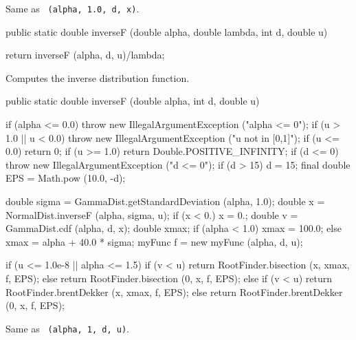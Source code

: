   \begin{tabb}
  Same as ~\texttt{(alpha, 1.0, d, x)}.
 \end{tabb}
\begin{code}

   public static double inverseF (double alpha, double lambda, int d,
                                  double u)\begin{hide} {
      return inverseF (alpha, d, u)/lambda;
   }\end{hide}
\end{code}
\begin{tabb}  Computes the inverse distribution function.
\end{tabb}
\begin{code}

   public static double inverseF (double alpha, int d, double u)\begin{hide} {
      if (alpha <= 0.0)
         throw new IllegalArgumentException ("alpha <= 0");
      if (u > 1.0 || u < 0.0)
         throw new IllegalArgumentException ("u not in [0,1]");
      if (u <= 0.0)
         return 0;
      if (u >= 1.0)
         return Double.POSITIVE_INFINITY;
      if (d <= 0)
         throw new IllegalArgumentException ("d <= 0");
      if (d > 15)
         d = 15;
      final double EPS = Math.pow (10.0, -d);

      double sigma = GammaDist.getStandardDeviation (alpha, 1.0);
      double x = NormalDist.inverseF (alpha, sigma, u);
      if (x < 0.)
         x = 0.;
      double v = GammaDist.cdf (alpha, d, x);
      double xmax;
      if (alpha < 1.0)
         xmax = 100.0;
      else
         xmax = alpha + 40.0 * sigma;
      myFunc f = new myFunc (alpha, d, u);

     if (u <= 1.0e-8 || alpha <= 1.5) {
         if (v < u)
            return RootFinder.bisection (x, xmax, f, EPS);
         else
            return RootFinder.bisection (0, x, f, EPS);
      } else {
          if (v < u)
            return RootFinder.brentDekker (x, xmax, f, EPS);
         else
            return RootFinder.brentDekker (0, x, f, EPS);
      }
   }\end{hide}
\end{code}
\begin{tabb} Same as
~\texttt{(alpha, 1, d, u)}.
\end{tabb}
